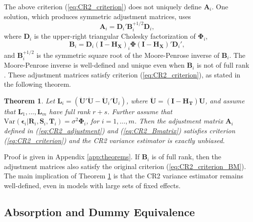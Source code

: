 \documentclass[draft]{ectaart}\usepackage[]{graphicx}\usepackage[]{color}
\newtheorem{thm}{Theorem}
\newcommand{\Var}{\text{Var}}
\newcommand{\bm}{\mathbf}
\newcommand{\bs}{\boldsymbol}
\begin{document}
The above criterion (\ref{eq:CR2_criterion}) does not uniquely define $\bm{A}_i$. One solution, which produces symmetric adjustment matrices, uses
\begin{equation}
\label{eq:CR2_adjustment}
\bm{A}_i = \bm{D}_i' \bm{B}_i^{+1/2} \bm{D}_i,
\end{equation}
where $\bm{D}_i$ is the upper-right triangular Cholesky factorization of $\bs\Phi_i$, 
\begin{equation}
\label{eq:CR2_Bmatrix}
\bm{B}_i = \bm{D}_i\left(\bm{I} - \bm{H_X}\right)_i \bs\Phi \left(\bm{I} - \bm{H_X}\right)' \bm{D}_i',
\end{equation}
and $\bm{B}_i^{+1/2}$ is the symmetric square root of the Moore-Penrose inverse of $\bm{B}_i $. 
The Moore-Penrose inverse is well-defined and unique even when $\bm{B}_i$ is not of full rank \citep[][Thm. 9.18]{Banerjee2014linear}. These adjustment matrices satisfy criterion (\ref{eq:CR2_criterion}), as stated in the following theorem.

\begin{thm}
\label{thm:BRL_FE}
Let $\bm{L}_i = \left(\bm{\ddot{U}}'\bm{\ddot{U}} - \bm{\ddot{U}}_i'\bm{\ddot{U}}_i\right)$, where $\bm{\ddot{U}} = \left(\bm{I} - \bm{H_T}\right)\bm{U}$, and assume that $\bm{L}_1,...,\bm{L}_m$ have full rank $r + s$. Further assume that $\Var\left(\bs\epsilon_i\left|\bm{R}_i,\bm{S}_i,\bm{T}_i\right.\right) = \sigma^2 \bs\Phi_i$, for $i = 1,...,m$. Then the adjustment matrix $\bm{A}_i$ defined in (\ref{eq:CR2_adjustment}) and (\ref{eq:CR2_Bmatrix}) satisfies criterion (\ref{eq:CR2_criterion}) and the CR2 variance estimator is exactly unbiased.
\end{thm}

Proof is given in Appendix \ref{app:theorems}. If $\bm{B}_i$ is of full rank, then the adjustment matrices also satisfy the original criterion (\ref{eq:CR2_criterion_BM}). The main implication of Theorem \ref{thm:BRL_FE} is that the CR2 variance estimator remains well-defined, even in models with large sets of fixed effects.

\subsection{Absorption and Dummy Equivalence}
\end{document}
